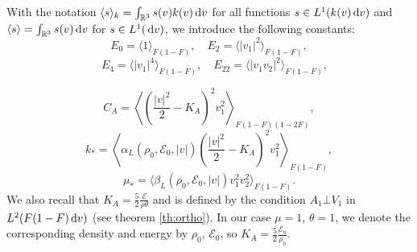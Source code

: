 With the notation $\langle s\rangle_k = \int_{\mathbb {R}^3} s(v)k(v){\,\mathrm{d} v}$ for all functions $s\in L^1(k(v){\,\mathrm{d} v})$ and $\langle s\rangle = \int_{\mathbb {R}^3} s(v) {\,\mathrm{d} v}$ for $s\in L^1({\,\mathrm{d} v})$, we introduce the following constants:
\[E_0=\langle1\rangle_{F(1-F)},\quad E_2=\langle |v_1|^2\rangle_{F(1-F)},\]\[
\quad E_4=\langle |v_1|^4\rangle_{F(1-F)},\quad E_{22}=\langle |v_1v_2|^2\rangle_{F(1-F)},\]

\[C_A=  \left\langle   \left(\frac{|v|^2}{2}-K_A\right)^2 v_1^2
\right\rangle_{F(1-F)(1-2F)},\]
\[k_\ast=\left\langle \alpha_L(\rho_0,\mathcal E_0,|v|) \left( \frac{|v|^2}{2}-K_A\right)^2v_1^2  
\right\rangle_{F(1-F)},\]
\[\mu_\ast=\langle \beta_L(\rho_0,\mathcal E_0,|v|) v_1^2v_2^2
\rangle_{F(1-F)}.\]
We also recall  that $K_A=\frac 52\frac{\mathcal E}{\rho\theta}$ and is defined by the condition $A_1\bot V_1$ in $L^2(F(1-F){\,\mathrm{d} v})$ (see theorem \ref{th:ortho}). In our case $\mu=1$, $\theta=1$, we denote the corresponding density and energy by $\rho_0$, $\mathcal E_0$, so $K_A=\frac 52\frac{\mathcal E_0}{\rho_0}$.
